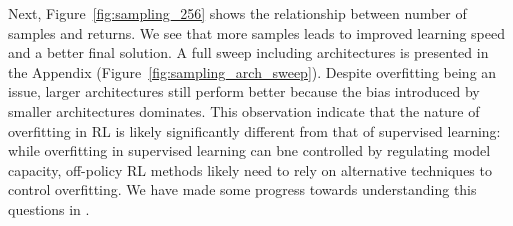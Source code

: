 Next, Figure~\ref{fig:sampling_256} shows the relationship between number of samples and returns. We see that more samples leads to improved learning speed and a better final solution. A full sweep including architectures is presented in the Appendix (Figure~\ref{fig:sampling_arch_sweep}). Despite overfitting being an issue, larger architectures still perform better because the bias introduced by smaller architectures dominates. This observation indicate that the nature of overfitting in RL is likely significantly different from that of supervised learning: while overfitting in supervised learning can bne controlled by regulating model capacity, off-policy RL methods likely need to rely on alternative techniques to control overfitting. We have made some progress towards understanding this questions in \citet{li2022effective}.   

